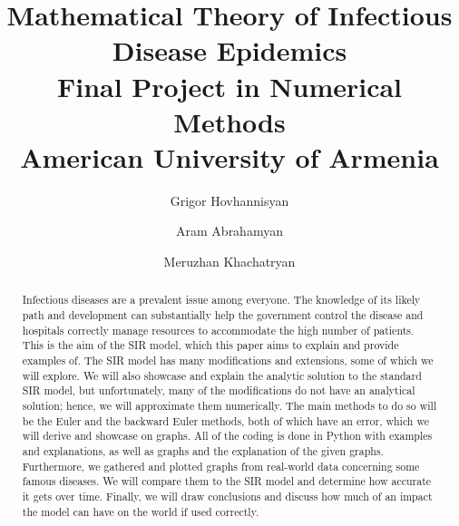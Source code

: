 \documentclass[a4paper,12pt]{article}
\title{ 
    Mathematical Theory of Infectious Disease Epidemics \\
        \large Final Project in Numerical Methods \\ American University of Armenia \\
}
\author{Grigor Hovhannisyan
\and
Aram Abrahamyan
\and
Meruzhan Khachatryan
}
\begin{document}
{ %
\maketitle\thispagestyle{empty}
\vspace{1cm}{}
}
\vspace{1cm}


{
\newpage
{}
\hypersetup{linkcolor=black} %
\tableofcontents
}

\newpage
\begin{abstract}
Infectious diseases are a prevalent issue among everyone. 
The knowledge of its likely path and development can substantially help the government control the disease and hospitals correctly manage resources to accommodate the high number of patients. 
This is the aim of the SIR model, which this paper aims to explain and provide examples of. 
The SIR model has many modifications and extensions, some of which we will explore. 
We will also showcase and explain the analytic solution to the standard SIR model, but unfortunately, many of the modifications do not have an analytical solution; hence, we will approximate them numerically. 
The main methods to do so will be the Euler and the backward Euler methods, both of which have an error, which we will derive and showcase on graphs. 
All of the coding is done in Python with examples and explanations, as well as graphs and the explanation of the given graphs.
Furthermore, we gathered and plotted graphs from real-world data concerning some famous diseases. 
We will compare them to the SIR model and determine how accurate it gets over time. 
Finally, we will draw conclusions and discuss how much of an impact the model can have on the world if used correctly.
\end{abstract}

\newpage
\pagestyle{fancy} %
\lhead{\nouppercase{\rightmark}}
\rhead{}











\appendix
\renewcommand\thefigure{\thesection.\arabic{figure}}
\renewcommand\thetable{\thesection.\arabic{table}} %
\lhead{\nouppercase{\rightmark}} %
\rhead{}



\newpage
\thispagestyle{SectionFirstPage} %
\rhead{}
\renewcommand\refname{References}
\printbibliography
\end{document}
